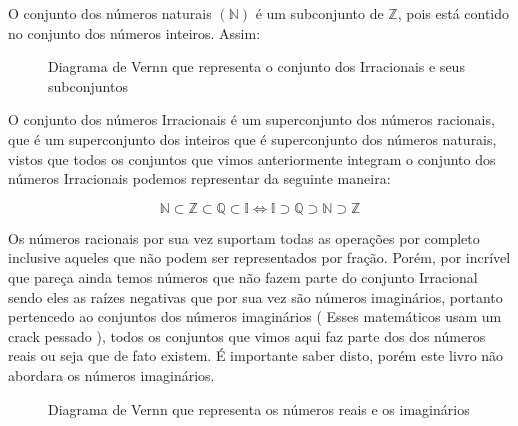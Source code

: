 \documentclass[letterpaper]{book}
\begin{document}
O conjunto dos números naturais \( (\mathbb{N}) \) é um subconjunto de \(\mathbb{Z}\), pois está contido no conjunto dos números inteiros. Assim:

\begin{figure}[H]
\centering
{}
\caption{Diagrama de Vernn que representa o conjunto dos Irracionais e seus subconjuntos}
\end{figure}

O conjunto dos números Irracionais é um superconjunto dos números racionais, que é um superconjunto dos inteiros que é superconjunto dos números naturais, vistos que todos os conjuntos que vimos anteriormente integram o conjunto dos números Irracionais podemos representar da seguinte maneira:




\[\mathbb{N} \subset \mathbb{Z} \subset \mathbb{Q} \subset \mathbb{I} \iff \mathbb{I} \supset \mathbb{Q} \supset \mathbb{N} \supset \mathbb{Z} \]

Os números racionais por sua vez suportam todas as operações por completo inclusive aqueles que não podem ser representados por fração. Porém, por incrível que pareça ainda temos números que não fazem parte do conjunto Irracional sendo eles as raízes negativas que por sua vez são números imaginários, portanto pertencedo ao conjuntos dos números imaginários ( Esses matemáticos usam um crack pessado ), todos os conjuntos que vimos aqui faz parte dos dos números reais ou seja que de fato existem. É importante saber disto, porém este livro não abordara os números imaginários.

\begin{figure}[H]
\centering
{}
\caption{Diagrama de Vernn que representa os números reais e os imaginários}
\end{figure}
\end{document}
